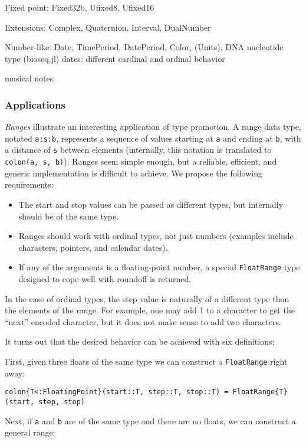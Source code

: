 Fixed point: Fixed32{b}, Ufixed8, Ufixed16

Extensions: Complex, Quaternion, Interval, DualNumber

Number-like: Date, TimePeriod, DatePeriod, Color, (Units), DNA nucleotide type (bioseq.jl)
dates: different cardinal and ordinal behavior

musical notes

\subsubsection{Applications}

\emph{Ranges} illustrate an interesting application of type promotion.
A range data type, notated \texttt{a:s:b}, represents a sequence of values
starting at \texttt{a} and ending at \texttt{b}, with a distance of \texttt{s}
between elements (internally, this notation is translated to
\texttt{colon(a, s, b)}). Ranges seem simple enough, but a reliable,
efficient, and generic implementation is difficult to achieve.
We propose the following requirements:

\begin{itemize}
\item The start and stop values can be passed as different types, but internally
  should be of the same type.
\item Ranges should work with ordinal types, not just numbers (examples include
  characters, pointers, and calendar dates).
\item If any of the arguments is a floating-point number, a special
  \texttt{FloatRange} type designed to cope well with roundoff is returned.
\end{itemize}

In the case of ordinal types, the step value is naturally of a different type
than the elements of the range. For example, one may add 1 to a character to
get the ``next'' encoded character, but it does not make sense to add two
characters.

It turns out that the desired behavior can be achieved with six definitions:

First, given three floats of the same type we can construct a \texttt{FloatRange}
right away:

\begin{verbatim}
colon{T<:FloatingPoint}(start::T, step::T, stop::T) = FloatRange{T}(start, step, stop)
\end{verbatim}

Next, if \texttt{a} and \texttt{b} are of the same type and there are no floats,
we can construct a general range:

